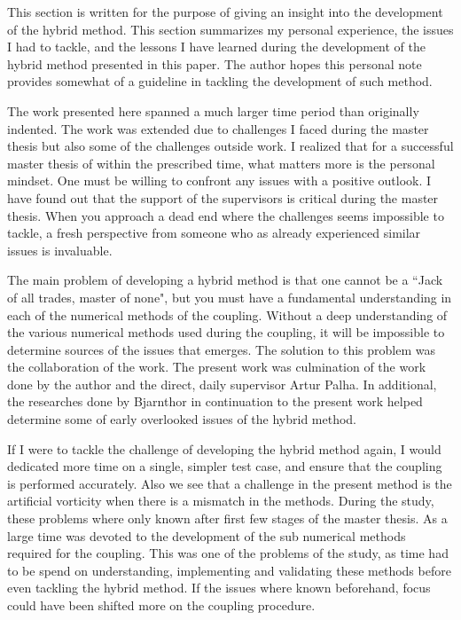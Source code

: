 
This section is written for the purpose of giving an insight into the development of the hybrid method. This section summarizes my personal experience, the issues I had to tackle, and the lessons I have learned during the development of the hybrid method presented in this paper. The author hopes this personal note provides somewhat of a guideline in tackling the development of such method.

The work presented here spanned a much larger time period than originally indented. The work was extended due to challenges I faced during the master thesis but also some of the challenges outside work. I realized that for a successful master thesis of within the prescribed time, what matters more is the personal mindset. One must be willing to confront any issues with a positive outlook. I have found out that the support of the supervisors is critical during the master thesis. When you approach a dead end where the challenges seems impossible to tackle, a fresh perspective from someone who as already experienced similar issues is invaluable.

The main problem of developing a hybrid method is that one cannot be a ``Jack of all trades, master of none", but you must have a fundamental understanding in each of the numerical methods of the coupling. Without a deep understanding of the various numerical methods used during the coupling, it will be impossible to determine sources of the issues that emerges. The solution to this problem was the collaboration of the work. The present work was culmination of the work done by the author and the direct, daily supervisor Artur Palha. In additional, the researches done by Bjarnthor in continuation to the present work helped determine some of early overlooked issues of the hybrid method. 

If I were to tackle the challenge of developing the hybrid method again, I would dedicated more time on a single, simpler test case, and ensure that the coupling is performed accurately. Also we see that a challenge in the present method is the artificial vorticity when there is a mismatch in the methods. During the study, these problems where only known after first few stages of the master thesis. As a large time was devoted to the development of the sub numerical methods required for the coupling. This was one of the problems of the study, as time had to be spend on understanding, implementing and validating these methods before even tackling the hybrid method. If the issues where known beforehand, focus could have been shifted more on the coupling procedure.

